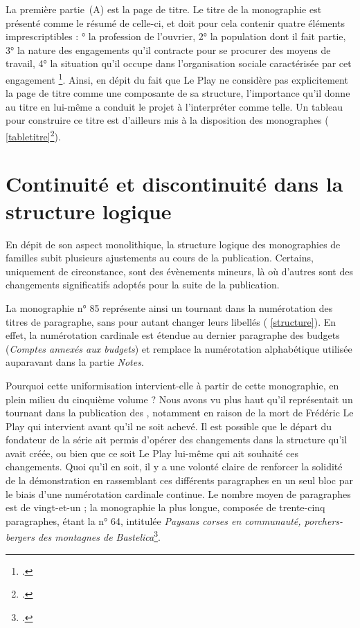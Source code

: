 La première partie~(A) est la page de titre. Le titre de la monographie est présenté comme le \og résumé \fg{} de celle-ci, et doit pour cela contenir quatre éléments imprescriptibles : ° la profession de l'ouvrier, 2° la population dont il fait partie, 3° la nature des engagements qu'il contracte pour se procurer des moyens de travail, 4° la situation qu'il occupe dans l'organisation sociale caractérisée par cet engagement \fg{}\footcite[p. 20]{instruction62}. Ainsi, en dépit du fait que Le Play ne considère pas explicitement la page de titre comme une composante de sa structure, l'importance qu'il donne au titre en lui-même a conduit le projet \timeus{} à l'interpréter comme telle. Un tableau pour construire ce titre est d'ailleurs mis à la disposition des monographes (\fig{} \ref{tabletitre}\footcite[p. 21 .]{instruction62}).

\section[Continuité et discontinuité]{Continuité et discontinuité dans la structure logique}

En dépit de son aspect monolithique, la structure logique des monographies de familles subit plusieurs ajustements au cours de la publication. Certains, uniquement de circonstance, sont des évènements mineurs, là où d'autres sont des changements significatifs adoptés pour la suite de la publication.

La monographie n° 85 représente ainsi un tournant dans la numérotation des titres de paragraphe, sans pour autant changer leurs libellés (\ann{} \ref{structure}). En effet, la numérotation cardinale est étendue au dernier paragraphe des budgets (\textit{Comptes annexés aux budgets}) et remplace la numérotation alphabétique utilisée auparavant dans la partie \textit{Notes}.

Pourquoi cette uniformisation intervient-elle à partir de cette monographie, en plein milieu du cinquième volume ? Nous avons vu plus haut qu'il représentait un tournant dans la publication des \odm, notamment en raison de la mort de Frédéric Le Play qui intervient avant qu'il ne soit achevé. Il est possible que le départ du fondateur de la série ait permis d'opérer des changements dans la structure qu'il avait créée, ou bien que ce soit Le Play lui-même qui ait souhaité ces changements. Quoi qu'il en soit, il y a une volonté claire de renforcer la solidité de la démonstration en rassemblant ces différents paragraphes en un seul bloc par le biais d'une numérotation cardinale continue. Le nombre moyen de paragraphes est de vingt-et-un ; la monographie la plus longue, composée de trente-cinq paragraphes, étant la n° 64, intitulée \textit{Paysans corses en communauté, porchers-bergers des montagnes de Bastelica}\footcite{mono064a}.

